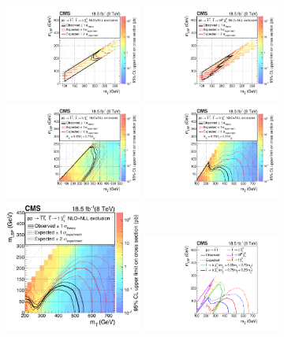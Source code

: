 \begin{figure}[htbp]
\centering
      \includegraphics[width=0.40\textwidth]{Figure_003-a.pdf}
      \includegraphics[width=0.40\textwidth]{Figure_003-b.pdf}
      \includegraphics[width=0.40\textwidth]{Figure_003-c.pdf}
      \includegraphics[width=0.40\textwidth]{Figure_003-d.pdf}
      \includegraphics[width=0.40\textwidth]{Figure_003-e.pdf}
      \includegraphics[width=0.40\textwidth]{Figure_003-f.pdf}

\end{figure}
